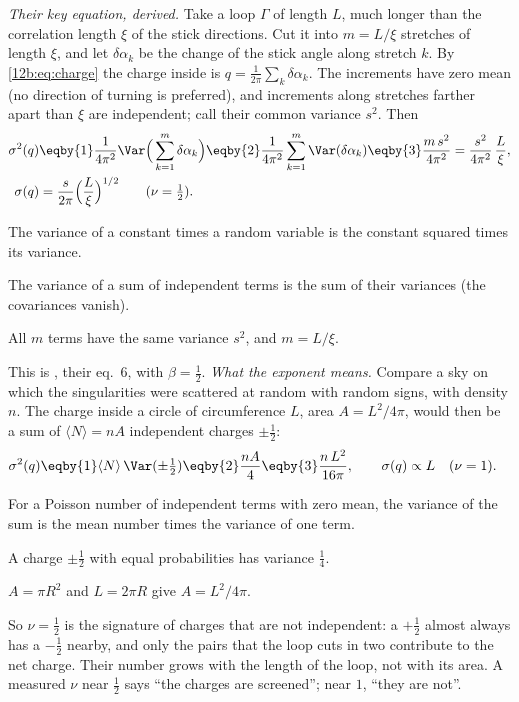 \emph{Their key equation, derived.} Take a loop $\Gamma$ of length $L$, much longer than the correlation length $\xi$
of the stick directions. Cut it into $m=L/\xi$ stretches of length $\xi$, and let $\delta\alpha_k$ be the change of the
stick angle along stretch $k$. By \eqref{12b:eq:charge} the charge inside is $q=\frac1{2\pi}\sum_k\delta\alpha_k$. The
increments have zero mean (no direction of turning is preferred), and increments along stretches farther apart than
$\xi$ are independent; call their common variance $s^2$. Then
\begin{align}
  \sigma^2(q)
  &\eqby{1}\frac{1}{4\pi^2}\Var\Big(\sum_{k=1}^{m}\delta\alpha_k\Big)
   \eqby{2}\frac{1}{4\pi^2}\sum_{k=1}^{m}\Var(\delta\alpha_k)
   \eqby{3}\frac{m\,s^2}{4\pi^2}=\frac{s^2}{4\pi^2}\,\frac{L}{\xi} ,\nonumber\\
  \sigma(q)&=\frac{s}{2\pi}\Big(\frac{L}{\xi}\Big)^{1/2}\qquad(\nu=\tfrac12).
  \label{12b:eq:nu-half}
\end{align}
\begin{explain}
  \item The variance of a constant times a random variable is the constant squared times its variance.
  \item The variance of a sum of independent terms is the sum of their variances (the covariances vanish).
  \item All $m$ terms have the same variance $s^2$, and $m=L/\xi$.
\end{explain}
This is \cite{VachaspatiLue2003}, their eq.~6, with $\beta=\frac12$. \emph{What the exponent means.} Compare a sky on
which the singularities were scattered at random with random signs, with density $n$. The charge inside a circle of
circumference $L$, area $A=L^2/4\pi$, would then be a sum of $\langle N\rangle=nA$ independent charges $\pm\frac12$:
\begin{align}
  \sigma^2(q)
  &\eqby{1}\langle N\rangle\,\Var(\pm\tfrac12)
   \eqby{2}\frac{nA}{4}
   \eqby{3}\frac{n\,L^2}{16\pi},\qquad \sigma(q)\propto L\quad(\nu=1).
  \label{12b:eq:nu-one}
\end{align}
\begin{explain}
  \item For a Poisson number of independent terms with zero mean, the variance of the sum is the mean number times the
        variance of one term.
  \item A charge $\pm\frac12$ with equal probabilities has variance $\frac14$.
  \item $A=\pi R^2$ and $L=2\pi R$ give $A=L^2/4\pi$.
\end{explain}
So $\nu=\frac12$ is the signature of charges that are not independent: a $+\frac12$ almost always has a $-\frac12$
nearby, and only the pairs that the loop cuts in two contribute to the net charge. Their number grows with the length
of the loop, not with its area. A measured $\nu$ near $\frac12$ says ``the charges are screened''; near $1$, ``they are
not''.

